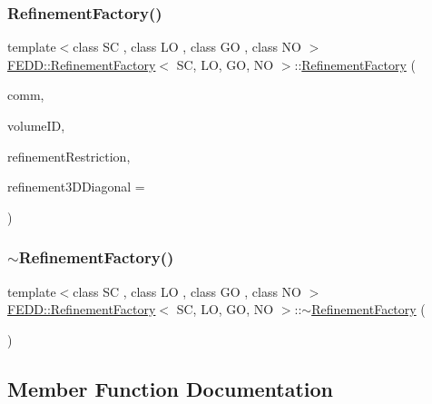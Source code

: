 \subsubsection{\texorpdfstring{Refinement\+Factory()}{RefinementFactory()}\hspace{0.1cm}{\footnotesize\ttfamily [3/3]}}
{\footnotesize\ttfamily template$<$class SC , class LO , class GO , class NO $>$ \\
\hyperlink{classFEDD_1_1RefinementFactory}{F\+E\+D\+D\+::\+Refinement\+Factory}$<$ SC, LO, GO, NO $>$\+::\hyperlink{classFEDD_1_1RefinementFactory}{Refinement\+Factory} (\begin{DoxyParamCaption}\item[{\hyperlink{classFEDD_1_1RefinementFactory_a58381e0786c65ec61d11bc73c224b45a}{Comm\+Const\+Ptr\+\_\+\+Type}}]{comm,  }\item[{int}]{volume\+ID,  }\item[{string}]{refinement\+Restriction,  }\item[{int}]{refinement3\+D\+Diagonal = {} }\end{DoxyParamCaption})}

\mbox{\label{classFEDD_1_1RefinementFactory_ae9b8ba9b12e35db03ef1b6363c1b9200}} 
\subsubsection{\texorpdfstring{$\sim$\+Refinement\+Factory()}{~RefinementFactory()}}
{\footnotesize\ttfamily template$<$class SC , class LO , class GO , class NO $>$ \\
\hyperlink{classFEDD_1_1RefinementFactory}{F\+E\+D\+D\+::\+Refinement\+Factory}$<$ SC, LO, GO, NO $>$\+::$\sim$\hyperlink{classFEDD_1_1RefinementFactory}{Refinement\+Factory} (\begin{DoxyParamCaption}{ }\end{DoxyParamCaption})}



\subsection{Member Function Documentation}
\mbox{\label{classFEDD_1_1RefinementFactory_af40b1acc9353be1408fed4d6a61ed2ae}} 
